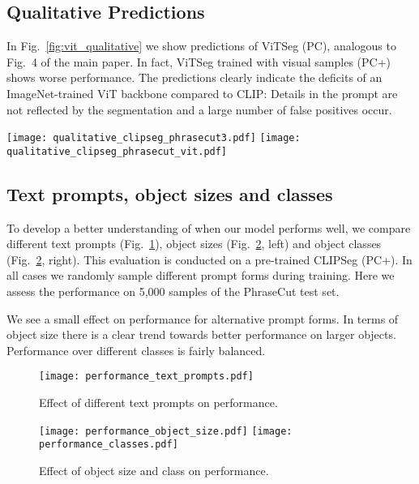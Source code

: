 \subsection*{Qualitative Predictions}

In Fig.~\ref{fig:vit_qualitative} we show predictions of ViTSeg (PC), analogous to Fig.~4 of the main paper. In fact, ViTSeg trained with visual samples (PC+) shows worse performance. 
The predictions clearly indicate the deficits of an ImageNet-trained ViT backbone compared to CLIP: Details in the prompt are not reflected by the segmentation and a large number of false positives occur. 

\begin{figure*}
    \centering
    \texttt{[image: qualitative\_clipseg\_phrasecut3.pdf]}
    \texttt{[image: qualitative\_clipseg\_phrasecut\_vit.pdf]}
    \caption{Qualitative predictions of CLIPSeg (PC+) (top, same as Fig.~4 of main paper for reference) and ViTSeg (PC) (bottom).}
    \label{fig:vit_qualitative}
\end{figure*}

\subsection*{Text prompts, object sizes and classes}

To develop a better understanding of when our model performs well, we compare different text prompts (Fig.~\ref{fig:text_prompts}), object sizes (Fig.~\ref{fig:performance_analysis}, left) and object classes (Fig.~\ref{fig:performance_analysis}, right). This evaluation is conducted on a pre-trained  CLIPSeg (PC+). In all cases we randomly sample different prompt forms during training. 
Here we assess the performance on 5,000 samples of the PhraseCut test set.

We see a small effect on performance for alternative prompt forms.
In terms of object size there is a clear trend towards better performance on larger objects.
Performance over different classes is fairly balanced.

\begin{figure}
    \centering
    \texttt{[image: performance\_text\_prompts.pdf]}
    \caption{Effect of different text prompts on performance.}
    \label{fig:text_prompts}
\end{figure}

\begin{figure}
    \centering
    \texttt{[image: performance\_object\_size.pdf]}
    \texttt{[image: performance\_classes.pdf]}
    \caption{Effect of object size and class on performance.}
    \label{fig:performance_analysis}
    
\end{figure}

